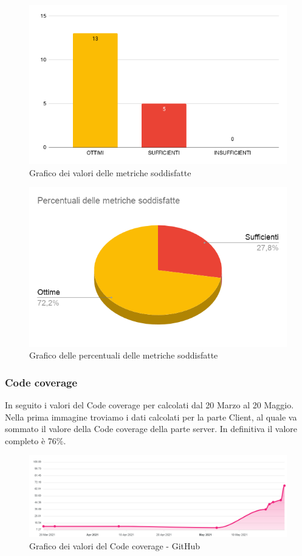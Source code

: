         \begin{figure}[H]
            \centering
            \includegraphics[width=12 cm]{source/sections/images/graf_metriche.png}
            \caption{Grafico dei valori delle metriche soddisfatte}
        \end{figure}

        \begin{figure}[H]
            \centering
            \includegraphics[width=14 cm]{source/sections/images/percentuale-metriche-soddisfatte.png}
            \caption{Grafico delle percentuali delle metriche soddisfatte}
        \end{figure}
\newpage
\subsubsection{Code coverage}
 In seguito i valori del Code coverage per calcolati dal 20 Marzo al 20 Maggio.
 Nella prima immagine troviamo i dati calcolati per la parte Client, al quale va sommato il valore della Code coverage della parte server.
 In definitiva il valore completo è 76\%.
    \begin{figure}[H]
        \centering
        \includegraphics[width=16 cm]{source/sections/images/CodeCoverage.png}
        \caption{Grafico dei valori del Code coverage - GitHub}
    \end{figure}


